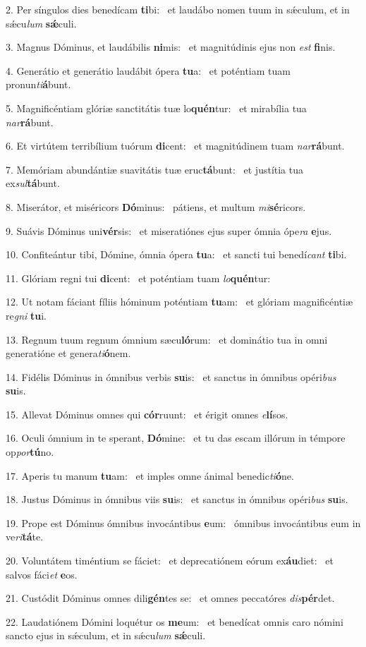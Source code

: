 2. Per síngulos dies benedícam \textbf{ti}bi: \ast\  et laudábo nomen tuum in sǽculum, et in sǽcu\textit{lum} \textbf{sǽ}culi.\

3. Magnus Dóminus, et laudábilis \textbf{ni}mis: \ast\  et magnitúdinis ejus non \textit{est} \textbf{fi}nis.\

4. Generátio et generátio laudábit ópera \textbf{tu}a: \ast\  et poténtiam tuam pronun\textit{ti}\textbf{á}bunt.\

5. Magnificéntiam glóriæ sanctitátis tuæ lo\textbf{quén}tur: \ast\  et mirabília tua \textit{nar}\textbf{rá}bunt.\

6. Et virtútem terribílium tuórum \textbf{di}cent: \ast\  et magnitúdinem tuam \textit{nar}\textbf{rá}bunt.\

7. Memóriam abundántiæ suavitátis tuæ eruc\textbf{tá}bunt: \ast\  et justítia tua ex\textit{sul}\textbf{tá}bunt.\

8. Miserátor, et miséricors \textbf{Dó}minus: \ast\  pátiens, et multum \textit{mi}\textbf{sé}ricors.\

9. Suávis Dóminus uni\textbf{vér}sis: \ast\  et miseratiónes ejus super ómnia ópe\textit{ra} \textbf{e}jus.\

10. Confiteántur tibi, Dómine, ómnia ópera \textbf{tu}a: \ast\  et sancti tui benedí\textit{cant} \textbf{ti}bi.\

11. Glóriam regni tui \textbf{di}cent: \ast\  et poténtiam tuam \textit{lo}\textbf{quén}tur:\

12. Ut notam fáciant fíliis hóminum poténtiam \textbf{tu}am: \ast\  et glóriam magnificéntiæ re\textit{gni} \textbf{tu}i.\

13. Regnum tuum regnum ómnium sæcu\textbf{ló}rum: \ast\  et dominátio tua in omni generatióne et genera\textit{ti}\textbf{ó}nem.\

14. Fidélis Dóminus in ómnibus verbis \textbf{su}is: \ast\  et sanctus in ómnibus opéri\textit{bus} \textbf{su}is.\

15. Allevat Dóminus omnes qui \textbf{cór}ruunt: \ast\  et érigit omnes \textit{e}\textbf{lí}sos.\

16. Oculi ómnium in te sperant, \textbf{Dó}mine: \ast\  et tu das escam illórum in témpore op\textit{por}\textbf{tú}no.\

17. Aperis tu manum \textbf{tu}am: \ast\  et imples omne ánimal benedic\textit{ti}\textbf{ó}ne.\

18. Justus Dóminus in ómnibus viis \textbf{su}is: \ast\  et sanctus in ómnibus opéri\textit{bus} \textbf{su}is.\

19. Prope est Dóminus ómnibus invocántibus \textbf{e}um: \ast\  ómnibus invocántibus eum in ve\textit{ri}\textbf{tá}te.\

20. Voluntátem timéntium se fáciet: \dag\  et deprecatiónem eórum ex\textbf{áu}diet: \ast\  et salvos fáci\textit{et} \textbf{e}os.\

21. Custódit Dóminus omnes dili\textbf{gén}tes se: \ast\  et omnes peccatóres \textit{dis}\textbf{pér}det.\

22. Laudatiónem Dómini loquétur os \textbf{me}um: \ast\  et benedícat omnis caro nómini sancto ejus in sǽculum, et in sǽcu\textit{lum} \textbf{sǽ}culi.\

